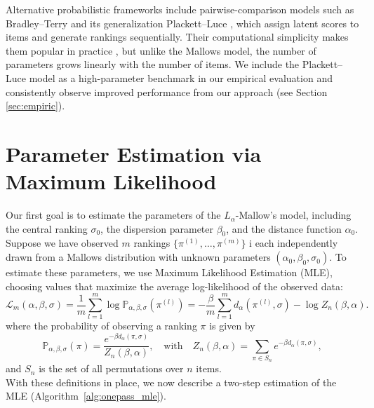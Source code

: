 \documentclass{article}
\renewcommand{\P}{\mathbb{P}}
\begin{document}
Alternative probabilistic frameworks include pairwise-comparison models such as Bradley–Terry \cite{bradley1976rank} and its generalization Plackett–Luce \cite{luce1959individual,plackett1975analysis}, which assign latent scores to items and generate rankings sequentially. Their computational simplicity makes them popular in practice \cite{ranking2010label,wainer2023bayesian}, but unlike the Mallows model, the number of parameters grows linearly with the number of items. We include the Plackett–Luce model as a high-parameter benchmark in our empirical evaluation and consistently observe improved performance from our approach (see Section \ref{sec:empiric}).



\section{Parameter Estimation  via Maximum Likelihood}\label{sec:mle}

Our first goal is to estimate the parameters of the $L_\alpha$-Mallow's model, including the central ranking $\sigma_0$, the dispersion parameter $\beta_0$, and the distance function $\alpha_0$.  Suppose we have observed  $m$ rankings   \(\{\pi^{(1)}, \dots, \pi^{(m)}\}\)  i each independently drawn from a Mallows distribution with unknown parameters $(\alpha_0,\beta_0,\sigma_0)$. To estimate these parameters, we use Maximum Likelihood Estimation (MLE),  choosing values that maximize the average log-likelihood of the observed data:
\[
\mathcal{L}_m(\alpha,\beta,\sigma) = \frac{1}{m}\sum_{l=1}^m \log \P_{\alpha,\beta, \sigma}(\pi^{(l)}) = -\frac{\beta}{m} \sum_{l=1}^m d_\alpha(\pi^{(l)}, \sigma) - \log Z_n(\beta,\alpha).
\]
where the probability of observing a ranking $\pi$ is given by
\[
\P_{\alpha,\beta,\sigma}(\pi) = \frac{e^{-\beta d_\alpha(\pi,\sigma)}}{Z_n(\beta,\alpha)},
\quad\text{with}\quad Z_n(\beta,\alpha) = \sum_{\pi \in {S_n}} e^{-\beta d_\alpha(\pi, \sigma)},
\]
and \({S_n}\) is the set of all permutations over $n$ items. \\
With these definitions in place, we now describe a two-step estimation of the MLE (Algorithm~\ref{alg:onepass_mle}).

\end{document}
